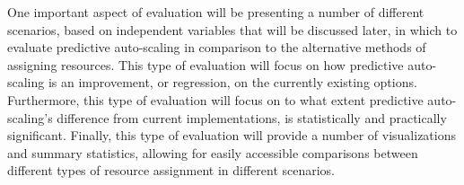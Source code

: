One important aspect of evaluation will be presenting a number of different
scenarios, based on independent variables that will be discussed later, in which
to evaluate predictive auto-scaling in comparison to the alternative methods
of assigning resources. This type of evaluation will focus on how predictive
auto-scaling is an improvement, or regression, on the currently existing
options. Furthermore, this type of evaluation will focus on to what extent
predictive auto-scaling's difference from current implementations,
is statistically and practically significant. Finally, this type of evaluation will
provide a number of visualizations and summary statistics, allowing for
easily accessible comparisons between different types of resource assignment
in different scenarios.
